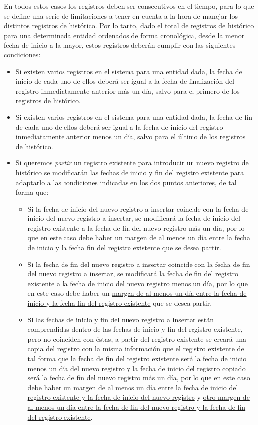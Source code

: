 En todos estos casos los registros deben ser consecutivos en el tiempo, para lo que se define una serie de limitaciones a tener en cuenta a la hora de manejar los distintos registros de histórico. Por lo tanto, dado el total de registros de histórico para una determinada entidad ordenados de forma cronológica, desde la menor fecha de inicio a la mayor, estos registros deberán cumplir con las siguientes condiciones:
\begin{itemize}
\item Si existen varios registros en el sistema para una entidad dada, la fecha de inicio de cada uno de ellos deberá ser igual a la fecha  de finalización del registro inmediatamente anterior más un día, salvo para el primero de los registros de histórico.
	\item Si existen varios registros en el sistema para una entidad dada, la fecha de fin de cada uno de ellos deberá ser igual a la fecha  de inicio del registro inmediatamente anterior menos un día, salvo para el último de los registros de histórico.
	\item Si queremos \textit{partir} un registro existente para introducir un nuevo registro de histórico se modificarán las fechas de inicio y fin del registro existente para adaptarlo a las condiciones indicadas en los dos puntos anteriores, de tal forma que:
	\begin{itemize}
		\item Si la fecha de inicio del nuevo registro a insertar coincide con la fecha de inicio del nuevo registro a insertar, se modificará la fecha de inicio del registro existente a la fecha de fin del nuevo registro más un día, por lo que en este caso debe haber un \uline{margen de al menos un día entre la fecha de inicio y la fecha fin del registro existente} que se desea partir. 
		\item Si la fecha de fin del nuevo registro a insertar coincide con la fecha de fin del nuevo registro a insertar, se modificará la fecha de fin del registro existente a la fecha de inicio del nuevo registro menos un día, por lo que en este caso debe haber un \uline{margen de al menos un día entre la fecha de inicio y la fecha fin del registro existente} que se desea partir. 
		\item Si las fechas de inicio y fin del nuevo registro a insertar están comprendidas dentro de las fechas de inicio y fin del registro existente, pero no coinciden con éstas, a partir del registro existente se creará una copia del registro con la misma información que el registro existente de tal forma que la fecha de fin del registro existente será la fecha de inicio menos un día del nuevo registro y la fecha de inicio del registro copiado será la fecha de fin del nuevo registro más un día, por lo que en este caso debe haber un \uline{margen de al menos un día entre la fecha de inicio del registro existente y la fecha de inicio del nuevo registro} y  \uline{otro margen de al menos un día entre la fecha de fin del nuevo registro y la fecha de fin del registro existente}.

\end{itemize}
\end{itemize}
